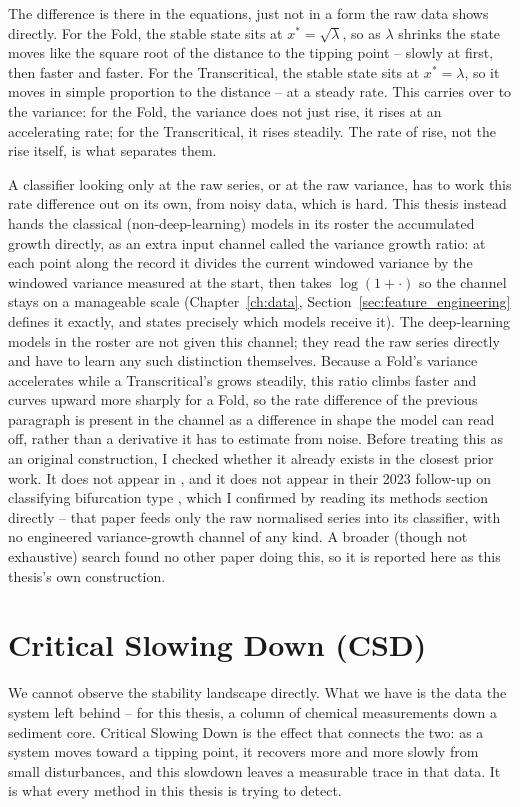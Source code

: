 The difference is there in the equations, just not in a form the raw data shows directly. For the Fold, the stable state sits at $x^* = \sqrt{\lambda}$, so as $\lambda$ shrinks the state moves like the square root of the distance to the tipping point -- slowly at first, then faster and faster. For the Transcritical, the stable state sits at $x^* = \lambda$, so it moves in simple proportion to the distance -- at a steady rate. This carries over to the variance: for the Fold, the variance does not just rise, it rises at an accelerating rate; for the Transcritical, it rises steadily. The rate of rise, not the rise itself, is what separates them.

A classifier looking only at the raw series, or at the raw variance, has to work this rate difference out on its own, from noisy data, which is hard. This thesis instead hands the classical (non-deep-learning) models in its roster the accumulated growth directly, as an extra input channel called the variance growth ratio: at each point along the record it divides the current windowed variance by the windowed variance measured at the start, then takes $\log(1+\cdot)$ so the channel stays on a manageable scale (Chapter~\ref{ch:data}, Section~\ref{sec:feature_engineering} defines it exactly, and states precisely which models receive it). The deep-learning models in the roster are not given this channel; they read the raw series directly and have to learn any such distinction themselves. Because a Fold's variance accelerates while a Transcritical's grows steadily, this ratio climbs faster and curves upward more sharply for a Fold, so the rate difference of the previous paragraph is present in the channel as a difference in shape the model can read off, rather than a derivative it has to estimate from noise. Before treating this as an original construction, I checked whether it already exists in the closest prior work. It does not appear in \citet{bury2021}, and it does not appear in their 2023 follow-up on classifying bifurcation type \citep{bury2023discretetime}, which I confirmed by reading its methods section directly -- that paper feeds only the raw normalised series into its classifier, with no engineered variance-growth channel of any kind. A broader (though not exhaustive) search found no other paper doing this, so it is reported here as this thesis's own construction.

\section{Critical Slowing Down (CSD)}
\label{sec:csd}
We cannot observe the stability landscape directly. What we have is the data the system left behind -- for this thesis, a column of chemical measurements down a sediment core. Critical Slowing Down is the effect that connects the two: as a system moves toward a tipping point, it recovers more and more slowly from small disturbances, and this slowdown leaves a measurable trace in that data. It is what every method in this thesis is trying to detect.

